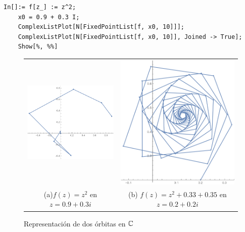 \begin{verbatim}
In[]:= f[z_] := z^2;
    x0 = 0.9 + 0.3 I;
    ComplexListPlot[N[FixedPointList[f, x0, 10]]];
    ComplexListPlot[N[FixedPointList[f, x0, 10]], Joined -> True];
    Show[%, %%]
\end{verbatim}

\begin{figure}[h]
    \begin{tabular}{cc}
      \includegraphics[scale=0.45]{./img/orbita-1.png} &   \includegraphics[scale=0.4]{./img/orbita-2.png} \\
    (a)$f(z)=z^2$ en $z=0.9+0.3i$ & (b) $f(z)=z^2+0.33+0.35$ en $z=0.2+0.2i$ \\[6pt]
    \end{tabular}
    \caption{Representación de dos órbitas en $\mathbb{C}$}
    \label{fig:orbitas-C}
\end{figure}

